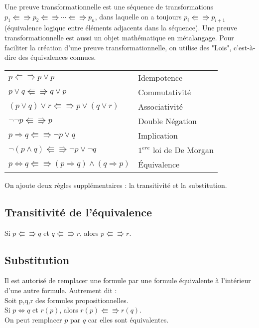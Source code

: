 Une preuve transformationnelle est une séquence de transformations
$p_1 \Lleftarrow \Rrightarrow p_2 \Lleftarrow \Rrightarrow \cdots \Lleftarrow \Rrightarrow p_n$,
dans laquelle on a toujours $p_i \Lleftarrow \Rrightarrow p_{i+1}$
(équivalence logique entre éléments adjacents dans la séquence).
Une preuve transformationnelle est aussi un objet mathématique en métalangage.
Pour faciliter la création d'une preuve transformationnelle,
on utilise des "Lois", c'est-à-dire des équivalences connues.
			\begin{center}
			\begin{tabular}{|ll|}
			\hline
			$p \Lleftarrow \Rrightarrow p \lor p$ & Idempotence\\
			$p \lor q \Lleftarrow \Rrightarrow q \lor p$ & Commutativité\\
			$(p \lor q) \lor r \Lleftarrow \Rrightarrow p \lor (q \lor r)$ & Associativité\\
			$ \lnot \lnot p \Lleftarrow \Rrightarrow p$ & Double Négation\\
			$p \Rightarrow q \Lleftarrow \Rrightarrow \lnot p \lor q$ & Implication\\
			$\lnot (p \land q) \Lleftarrow \Rrightarrow \lnot p \lor \lnot q$ & $1^{ere}$ loi de De Morgan\\
			$p \Leftrightarrow q \Lleftarrow \Rrightarrow (p \Rightarrow q) \land (q \Rightarrow p)$ & Équivalence\\
			\hline
			\end{tabular}
			\end{center}
On ajoute deux règles supplémentaires : la transitivité et la substitution.
			\subsection*{Transitivité de l'équivalence}
			\indent Si $p \Lleftarrow \Rrightarrow q$ et $q \Lleftarrow \Rrightarrow r$, alors $p \Lleftarrow \Rrightarrow r$.
			\subsection*{Substitution}
			Il est autorisé de remplacer une formule par une formule équivalente à l’intérieur d’une autre formule. Autrement dit : \\
			\indent Soit p,q,r des formules propositionnelles.\\
			\indent Si $p \Leftrightarrow q$ et $r(p)$, alors $r(p) \Lleftarrow \Rrightarrow r(q)$.\\
			On peut remplacer $p$ par $q$ car elles sont équivalentes. 
			

